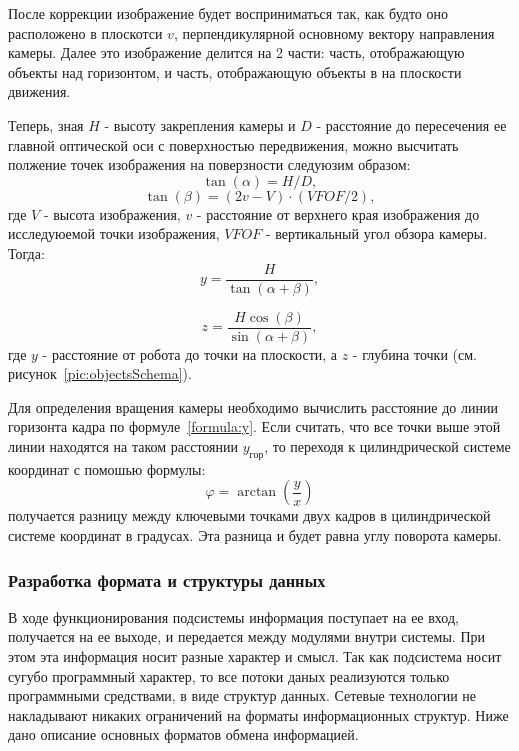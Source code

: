 После коррекции изображение будет восприниматься так, как будто оно расположено в плоскотси $v$, перпендикулярной основному вектору направления камеры.  Далее это изображение делится на 2 части: часть, отображающую объекты над горизонтом, и часть, отображающую объекты в на плоскости движения. 

Теперь, зная $H$ - высоту закрепления камеры и $D$ - расстояние до пересечения ее главной оптической оси с поверхностью передвижения, можно высчитать полжение точек изображения на поверзности следуюзим образом:
$$
\tan(\alpha ) = H/D,
$$
$$
\tan(\beta ) = (2 v - V) \cdot (VFOF / 2),
$$
где $V$ - высота изображения, $v$ - расстояние от верхнего края изображения до исследуюемой точки изображения, $VFOF$ - вертикальный угол обзора камеры. Тогда:
\begin{equation}\label{formula:y}
y = \frac{H}{\tan (\alpha + \beta) },
\end{equation}

$$
z = \frac{H \cos(\beta)}{\sin (\alpha + \beta)},
$$
где $y$ - расстояние от робота до точки на плоскости, а $z$ - глубина точки (см. рисунок~\ref{pic:objectsSchema}).

Для определения вращения камеры необходимо вычислить расстояние до линии горизонта кадра по формуле~\ref{formula:y}. Если считать, что все точки выше этой линии находятся на таком расстоянии $y_{гор}$, то переходя к цилиндрической системе координат с помошью формулы:
$$
	\varphi = \arctan (\frac{y}{x})
$$
получается разницу между ключевыми точками двух кадров в цилиндрической системе координат в градусах. Эта разница и будет равна углу поворота камеры. 

\subsubsection{Разработка формата и структуры данных}
В ходе функционирования подсистемы информация поступает на ее вход, получается на ее выходе, и передается между модулями внутри системы. 
При этом эта информация носит разные характер и смысл. Так как подсистема носит сугубо программный характер, то все потоки даных реализуются только программными средствами, в виде структур данных. Сетевые технологии не накладывают никаких ограничений на форматы информационных структур. 
Ниже дано описание основных форматов обмена информацией.

